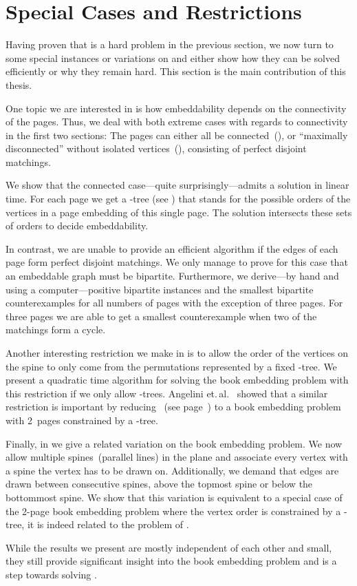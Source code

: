 \chapter{Special Cases and Restrictions}
\label{chapter:special}

Having proven that \probBook is a hard problem in the previous section,
we now turn to some special instances or variations on \probBook and
either show how they can be solved efficiently or why they remain hard.
This section is the main contribution of this thesis.

One topic we are interested in is how embeddability depends
on the connectivity of the pages. Thus, we deal with both extreme
cases with regards to connectivity in the first two sections: The pages
can either all be connected~(), or ``maximally
disconnected'' without isolated vertices~(), \ie consisting of perfect disjoint matchings.

We show that the connected case---quite surprisingly---admits a solution
in linear time.
For each page we get a \PQ-tree (see ) that stands for the
possible orders of the vertices in a page embedding of this single page.
The solution intersects these sets of orders to decide embeddability. 

In contrast, we are unable to provide an efficient algorithm if the edges of each
page form perfect disjoint matchings. We only manage to prove for this
case that an embeddable graph must be bipartite. Furthermore, we derive---by hand and using a computer---positive bipartite instances and the smallest bipartite counterexamples for all numbers of pages with the
exception of three pages. For three pages we are able to get a smallest counterexample
when two of the matchings form a cycle.

Another interesting restriction we make in  is to allow the order of the 
vertices on the spine to only come from the
permutations represented by a fixed \PQ-tree. We present a quadratic time algorithm
for solving the book embedding problem with this restriction if we only allow \Q-trees.
Angelini et.\,al.~\cite{angelini11} showed that a similar restriction is important by reducing \SEFECON~(see page~\pageref{prob:sefecon}) to a book embedding problem
with 2~pages constrained by a \PT-tree.

Finally, in  we give a related 
variation on the book embedding problem. We now allow multiple spines~(parallel lines) in the plane
and associate every vertex with a spine the vertex has to be drawn on. 
Additionally, we demand that edges are drawn between consecutive spines, above the
topmost spine or below the bottommost spine. We show that this variation is equivalent to
a special case of the 2-page book embedding problem where the vertex order is constrained
by a \PT-tree, \ie it is indeed related to the problem
of .

While the results we present are mostly independent of each other and small, they
still provide significant insight into the book embedding problem and
 is a step towards solving . 




